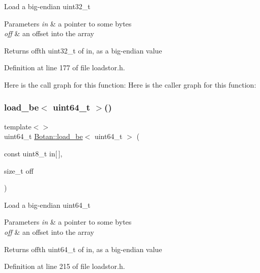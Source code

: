 Load a big-\/endian uint32\+\_\+t 
\begin{DoxyParams}{Parameters}
{\em in} & a pointer to some bytes \\
\hline
{\em off} & an offset into the array \\
\hline
\end{DoxyParams}
\begin{DoxyReturn}{Returns}
off\textquotesingle{}th uint32\+\_\+t of in, as a big-\/endian value 
\end{DoxyReturn}


Definition at line 177 of file loadstor.\+h.

Here is the call graph for this function\+:
Here is the caller graph for this function\+:
\mbox{\label{namespace_botan_a96d5556307d65f0974740f8c3fc33639}} 
\subsubsection{\texorpdfstring{load\+\_\+be$<$ uint64\+\_\+t $>$()}{load\_be< uint64\_t >()}}
{\footnotesize\ttfamily template$<$$>$ \\
uint64\+\_\+t \mbox{\hyperlink{namespace_botan_a640029f085cc0a904b32e20f42303dd2}{Botan\+::load\+\_\+be}}$<$ uint64\+\_\+t $>$ (\begin{DoxyParamCaption}\item[{const uint8\+\_\+t}]{in\mbox{[}$\,$\mbox{]},  }\item[{size\+\_\+t}]{off }\end{DoxyParamCaption})\hspace{0.3cm}{\ttfamily [inline]}}

Load a big-\/endian uint64\+\_\+t 
\begin{DoxyParams}{Parameters}
{\em in} & a pointer to some bytes \\
\hline
{\em off} & an offset into the array \\
\hline
\end{DoxyParams}
\begin{DoxyReturn}{Returns}
off\textquotesingle{}th uint64\+\_\+t of in, as a big-\/endian value 
\end{DoxyReturn}


Definition at line 215 of file loadstor.\+h.

